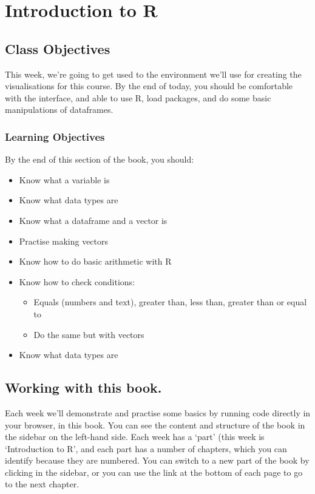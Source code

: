 \documentclass[
  letterpaper,
  DIV=11,
  numbers=noendperiod]{scrreprt}
\providecommand{\tightlist}{%
  \setlength{\itemsep}{0pt}\setlength{\parskip}{0pt}}
\begin{document}
\chapter{Introduction to R}\label{introduction-to-r-1}

\section{Class Objectives}\label{class-objectives}

This week, we're going to get used to the environment we'll use for
creating the visualisations for this course. By the end of today, you
should be comfortable with the interface, and able to use R, load
packages, and do some basic manipulations of dataframes.

\subsection{Learning Objectives}\label{learning-objectives}

By the end of this section of the book, you should:

\begin{itemize}
\tightlist
\item
  Know what a variable is
\item
  Know what data types are
\item
  Know what a dataframe and a vector is
\item
  Practise making vectors
\item
  Know how to do basic arithmetic with R
\item
  Know how to check conditions:

  \begin{itemize}
  \tightlist
  \item
    Equals (numbers and text), greater than, less than, greater than or
    equal to
  \item
    Do the same but with vectors
  \end{itemize}
\item
  Know what data types are
\end{itemize}

\section{Working with this book.}\label{working-with-this-book.}

Each week we'll demonstrate and practise some basics by running code
directly in your browser, in this book. You can see the content and
structure of the book in the sidebar on the left-hand side. Each week
has a `part' (this week is `Introduction to R', and each part has a
number of chapters, which you can identify because they are numbered.
You can switch to a new part of the book by clicking in the sidebar, or
you can use the link at the bottom of each page to go to the next
chapter.
\end{document}
